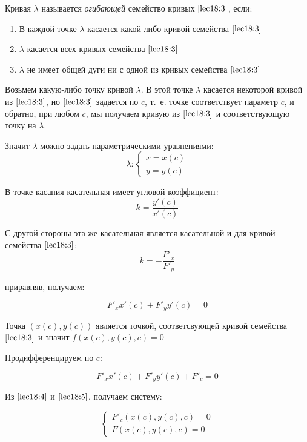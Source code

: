 \documentclass[../../main.tex]{subfiles}
\begin{document}
Кривая $\lambda$ называется \emph{ огибающей} семейство кривых $\eqref{lec18:3}$, если:

\begin{enumerate}
	\item В каждой точке $\lambda$ касается какой-либо кривой семейства $\eqref{lec18:3}$
	\item $\lambda$ касается всех кривых семейства $\eqref{lec18:3}$
	\item $\lambda$ не имеет общей дуги ни с одной из кривых семейства $\eqref{lec18:3}$
\end{enumerate}

Возьмем какую-либо точку кривой $\lambda$. В этой точке $\lambda$ касается некоторой кривой из $\eqref{lec18:3}$, но $\eqref{lec18:3}$ задается по $c$, т.~е. точке соответствует параметр $c$, и обратно, при любом $c$, мы получаем кривую из $\eqref{lec18:3}$ и соответствующую точку на $\lambda$.

Значит $\lambda$ можно задать параметрическими уравнениями:
\[ \lambda \colon \begin{cases}
x=x\left( c \right) \\
y=y\left( c \right)  
\end{cases} \]

В точке касания касательная имеет угловой коэффициент:
\[ k = \frac{y' \left( c \right) }{ x' \left( c \right) } \]

С другой стороны эта же касательная является касательной и для кривой семейства $\eqref{lec18:3} $:
\[ k = - \frac{F'_x}{ F'_y}\] 

приравняв, получаем:

\begin{equation}\label{lec18:4} F'_x x'\left( c \right) + F'_y y'\left( c \right) = 0 \end{equation}

Точка $\left( x \left( c\right), y\left( c\right)  \right) $ является точкой, соответсвующей кривой семейства $\eqref{lec18:3} $ и значит $f \left( x \left( c\right), y\left( c\right), c \right) = 0 $

Продифференцируем по $c$:

\begin{equation}\label{lec18:5} F'_x x'\left( c \right) + F'_y y'\left( c \right) + F'_c = 0 \end{equation}

Из $\eqref{lec18:4}$ и $\eqref{lec18:5}$, получаем систему:

\begin{equation}\label{lec18:6} \begin{cases}
F'_c \left( x \left( c\right), y\left( c\right), c \right)  = 0\\
F \left( x \left( c\right), y\left( c\right), c \right)  = 0
\end{cases}  \end{equation}
\end{document}
